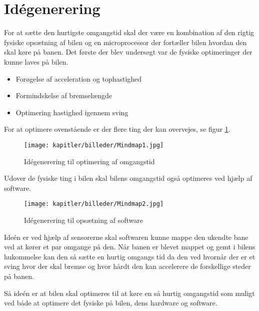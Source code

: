 
\newpage
\section{Idégenerering}
For at sætte den hurtigste omgangstid skal der være en kombination af den rigtig fysiske opsætning af bilen og en microprocessor der fortæller bilen hvordan den skal køre på banen. Det første der blev undersøgt var de fysiske optimeringer der kunne laves på bilen.
\begin{itemize}
\item Forøgelse af acceleration og tophastighed
\item Formindskelse af bremselængde
\item Optimering hastighed igennem sving
\end{itemize}
For at optimere ovenstående er der flere ting der kan overvejes, se figur \ref{fig:mindmap1}.

\begin{figure}[ht]
    \centering
    \texttt{[image: kapitler/billeder/Mindmap1.jpg]}
    \caption{Idégenerering til optimering af omgangstid}
    \label{fig:mindmap1}
\end{figure}

Udover de fysiske ting i bilen skal bilens omgangstid også optimeres ved hjælp af software.


\newpage

\begin{figure}[ht]
    \centering
    \texttt{[image: kapitler/billeder/Mindmap2.jpg]}
    \caption{Idégenerering til opsætning af software}
    \label{fig:mindmap2}
\end{figure}


Ideén er ved hjælp af sensorerne skal softwaren kunne mappe den ukendte bane ved at kører et par omgange på den. Når banen er blevet mappet og gemt i bilens hukommelse kan den så sætte en hurtig omgangs tid da den ved hvornår der er et sving hvor der skal bremse og hvor hårdt den kan accelerere de forskellige steder på banen.

Så ideén er at bilen skal optimeres til at køre en så hurtig omgangstid som muligt ved både at optimere det fysiske på bilen, dens hardware og software.
